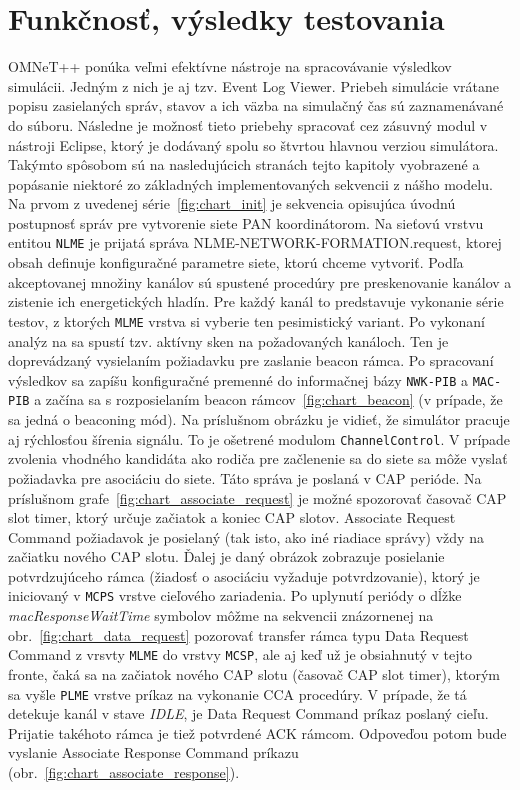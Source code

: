 \chapter{Funkčnosť, výsledky testovania}

\indent\indent OMNeT++ ponúka veľmi efektívne nástroje na spracovávanie výsledkov simulácii. Jedným z nich je aj tzv. Event Log Viewer. Priebeh simulácie vrátane popisu zasielaných správ, stavov a ich väzba na simulačný čas sú zaznamenávané do súboru. Následne je možnosť tieto priebehy spracovať cez zásuvný modul v nástroji Eclipse, ktorý je dodávaný spolu so štvrtou hlavnou verziou simulátora. Takýmto spôsobom sú na nasledujúcich stranách tejto kapitoly vyobrazené a popásanie niektoré zo základných implementovaných sekvencii z nášho modelu.\\
\indent Na prvom z uvedenej série~\ref{fig:chart_init} je sekvencia opisujúca úvodnú postupnosť správ pre vytvorenie siete PAN koordinátorom. Na sieťovú vrstvu entitou \texttt{NLME} je prijatá správa NLME-NETWORK-FORMATION.request, ktorej obsah definuje konfiguračné parametre siete, ktorú chceme vytvoriť. Podľa akceptovanej množiny kanálov sú spustené procedúry pre preskenovanie kanálov a zistenie ich energetických hladín. Pre každý kanál to predstavuje vykonanie série testov, z ktorých \texttt{MLME} vrstva si vyberie ten pesimistický variant. Po vykonaní analýz na sa spustí tzv. aktívny sken na požadovaných kanáloch. Ten je doprevádzaný vysielaním požiadavku pre zaslanie beacon rámca. Po spracovaní výsledkov sa zapíšu konfiguračné premenné do informačnej bázy \texttt{NWK-PIB} a \texttt{MAC-PIB} a začína sa s rozposielaním beacon rámcov~\ref{fig:chart_beacon} (v prípade, že sa jedná o beaconing mód). Na príslušnom obrázku je vidieť, že simulátor pracuje aj rýchlosťou šírenia signálu. To je ošetrené modulom \texttt{ChannelControl}. V prípade zvolenia vhodného kandidáta ako rodiča pre začlenenie sa do siete sa môže vyslať požiadavka pre asociáciu do siete. Táto správa je poslaná v CAP perióde. Na príslušnom grafe~\ref{fig:chart_associate_request} je možné spozorovať časovač CAP slot timer, ktorý určuje začiatok a koniec CAP slotov. Associate Request Command požiadavok je posielaný (tak isto, ako iné riadiace správy) vždy na začiatku nového CAP slotu. Ďalej je daný obrázok zobrazuje posielanie potvrdzujúceho rámca (žiadosť o asociáciu vyžaduje potvrdzovanie), ktorý je iniciovaný v \texttt{MCPS} vrstve cieľového zariadenia. Po uplynutí periódy o dĺžke \textit{macResponseWaitTime} symbolov môžme na sekvencii znázornenej na obr.~\ref{fig:chart_data_request} pozorovať transfer rámca typu Data Request Command z vrsvty \texttt{MLME} do vrstvy \texttt{MCSP}, ale aj keď už je obsiahnutý v tejto fronte, čaká sa na začiatok nového CAP slotu (časovač CAP slot timer), ktorým sa vyšle \texttt{PLME} vrstve príkaz na vykonanie CCA procedúry. V prípade, že tá detekuje kanál v stave \textit{IDLE}, je Data Request Command príkaz poslaný cieľu. Prijatie takéhoto rámca je tiež potvrdené ACK rámcom. Odpoveďou potom bude vyslanie Associate Response Command príkazu (obr.~\ref{fig:chart_associate_response}).\\
